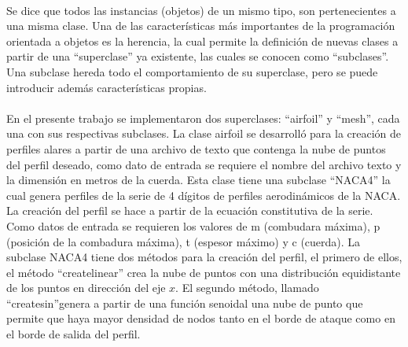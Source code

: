 \documentclass[letterpaper, openright, 12pt]{book}
\begin{document}
	\paragraph*{}
		Se dice que todos las instancias (objetos) de un mismo tipo, son pertenecientes a una misma clase. Una de las características más importantes de la programación orientada a objetos es la herencia, la cual permite la definición de nuevas clases a partir de una ``superclase'' ya existente, las cuales se conocen como ``subclases''. Una subclase hereda todo el comportamiento de su superclase, pero se puede introducir además características propias.
		
	\paragraph*{}
		En el presente trabajo se implementaron dos superclases: ``airfoil'' y ``mesh'', cada una con sus respectivas subclases.
		La clase airfoil se desarrolló para la creación de perfiles alares a partir de una archivo de texto que contenga la nube de puntos del perfil deseado, como dato de entrada se requiere el nombre del archivo texto y la dimensión en metros de la cuerda. Esta clase tiene una subclase ``NACA4'' la cual genera perfiles de la serie de 4 dígitos de perfiles aerodinámicos de la NACA. La creación del perfil se hace a partir de la ecuación constitutiva de la serie. Como datos de entrada se requieren los valores de m (combudara máxima), p (posición de la combadura máxima), t (espesor máximo) y c (cuerda). La subclase NACA4 tiene dos métodos para la creación del perfil, el primero de ellos, el método ``create\textunderscore linear'' crea la nube de puntos con una distribución equidistante de los puntos en dirección del eje $x$. El segundo método, llamado ``create\textunderscore sin''genera a partir de una función senoidal una nube de punto que permite que haya mayor densidad de nodos tanto en el borde de ataque como en el borde de salida del perfil.
			 
			 
				
			
		 
		
		
		
		
	
	\cleardoublepage
	
	
	
	
	
	
\end{document}
